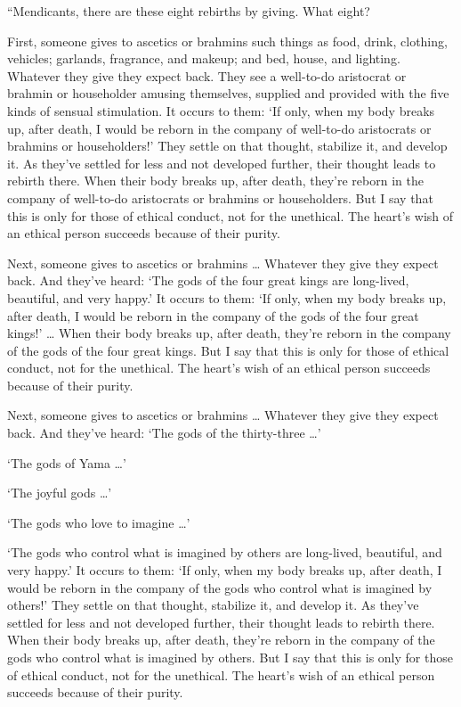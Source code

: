 \documentclass[12pt,openany]{book}%
\begin{document}
“Mendicants, there are these eight rebirths by giving. What eight? 

First, someone gives to ascetics or brahmins such things as food, drink, clothing, vehicles; garlands, fragrance, and makeup; and bed, house, and lighting. Whatever they give they expect back. They see a well-to-do aristocrat or brahmin or householder amusing themselves, supplied and provided with the five kinds of sensual stimulation. It occurs to them: ‘If only, when my body breaks up, after death, I would be reborn in the company of well-to-do aristocrats or brahmins or householders!’ They settle on that thought, stabilize it, and develop it. As they’ve settled for less and not developed further, their thought leads to rebirth there. When their body breaks up, after death, they’re reborn in the company of well-to-do aristocrats or brahmins or householders. But I say that this is only for those of ethical conduct, not for the unethical. The heart’s wish of an ethical person succeeds because of their purity. 

Next, someone gives to ascetics or brahmins … Whatever they give they expect back. And they’ve heard: ‘The gods of the four great kings are long-lived, beautiful, and very happy.’ It occurs to them: ‘If only, when my body breaks up, after death, I would be reborn in the company of the gods of the four great kings!’ … When their body breaks up, after death, they’re reborn in the company of the gods of the four great kings. But I say that this is only for those of ethical conduct, not for the unethical. The heart’s wish of an ethical person succeeds because of their purity. 

Next, someone gives to ascetics or brahmins … Whatever they give they expect back. And they’ve heard: ‘The gods of the thirty-three …’ 

‘The gods of Yama …’ 

‘The joyful gods …’ 

‘The gods who love to imagine …’ 

‘The gods who control what is imagined by others are long-lived, beautiful, and very happy.’ It occurs to them: ‘If only, when my body breaks up, after death, I would be reborn in the company of the gods who control what is imagined by others!’ They settle on that thought, stabilize it, and develop it. As they’ve settled for less and not developed further, their thought leads to rebirth there. When their body breaks up, after death, they’re reborn in the company of the gods who control what is imagined by others. But I say that this is only for those of ethical conduct, not for the unethical. The heart’s wish of an ethical person succeeds because of their purity. 
\end{document}
